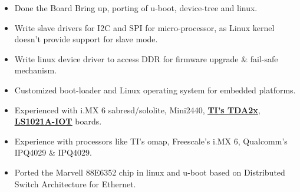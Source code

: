 \documentclass[10pt, a4paper]{article}
\begin{document}
\begin{minipage}[t]{0.66\textwidth}
\begin{itemize}[label={-}, topsep=0pt, partopsep=0pt, itemsep=0pt, parsep=0pt]
      \item \noindent Done the Board Bring up, porting of u-boot, device-tree and linux.
      \item \noindent Write slave drivers for I2C and SPI for micro-processor, as Linux kernel doesn’t provide support for slave mode.
      \item \noindent Write linux device driver to access DDR for firmware upgrade \& fail-safe mechanism.
      \item \noindent Customized boot-loader and Linux operating system for embedded platforms.
      \item \noindent Experienced with i.MX 6 sabresd/sololite, Mini2440,
         \href{http://www.radiumboards.com/TI\_TDA2x\_Based\_xCAM\_Platform.php}{\textbf{\underline{TI's TDA2x}}},
         \href{http://www.nxp.com/products/reference-designs/qoriq-ls1021a-iot-gateway-reference-design:LS1021A-IoT}{\textbf{\underline{LS1021A-IOT}}} boards.
      \item \noindent Experience with processors like TI's omap, Freescale's i.MX 6, Qualcomm's IPQ4029 \& IPQ4029.
      \item \noindent Ported the Marvell 88E6352 chip in linux and u-boot based on Distributed Switch Architecture for Ethernet.
   \end{itemize}
\end{minipage}%
%
%
%
%
%
\newline%
\vspace{0pt}%
\end{document}
